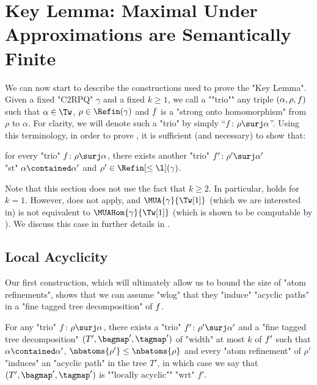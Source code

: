 \section[Proof of the Key Lemma]{Key Lemma: Maximal Under Approximations are Semantically Finite}
\label{sec:proof-key-lemma}

\AP We can now start to describe the constructions used to prove the "Key Lemma". Given a fixed "C2RPQ" $\gamma$ and a fixed $k \geq 1$,
we call a ""trio"" any triple $(\alpha,\rho,f)$ such that 
$\alpha \in \Tw$,
$\rho \in \Refin(\gamma)$ and 
$f$ is a "strong onto homomorphism" from $\rho$ to $\alpha$. 
For clarity, we will denote such a "trio" by simply ``$\fun\colon \rho \surj \alpha$''. 
Using this terminology, in order to prove , it is sufficient (and necessary) to show that:
\begin{center}
	for every "trio" $\fun\colon \rho \surj \alpha$,
	there exists another "trio" $\fun'\colon \rho' \surj \alpha'$\\
	"st" $\alpha \contained \alpha'$ and $\rho'\in \Refin[\leq \l](\gamma)$.
\end{center}

\begin{remark}
	\AP\label{rk:key-lemma-tw1}
	Note that this section does not use the fact that $k \geq 2$. In particular,
	 holds for $k=1$. However,
	 does not apply,
	and $\MUA{\gamma}{\Tw[1]}$ (which we are interested in)
	is not equivalent to $\MUAHom{\gamma}{\Tw[1]}$ (which is shown to be computable by ). We discuss this case in further details in .
\end{remark}

\subsection{Local Acyclicity}
Our first construction, which will ultimately allow us to bound the size of "atom refinements",
shows that we can assume "wlog" that they "induce" "acyclic paths" in a "fine tagged 
tree decomposition" of $f$.

\begin{lemma}
    \AP\label{lemma:locally_acyclic_treedec}
    For any "trio" $\fun\colon \rho \surj \alpha$, there exists a "trio" $\fun'\colon \rho' \surj \alpha'$ and a "fine tagged tree decomposition" $(T', \bagmap', \tagmap')$ of "width" at most 
    $k$ of $f'$ such that
    $\alpha \contained \alpha'$, $\nbatoms{\rho'} \leq \nbatoms{\rho}$ and every "atom refinement" of
    $\rho'$ "induces" an "acyclic path" in the tree $T'$, in which case
    we say that $(T', \bagmap', \tagmap')$ is ""locally acyclic""
	"wrt" $f'$.
\end{lemma}

